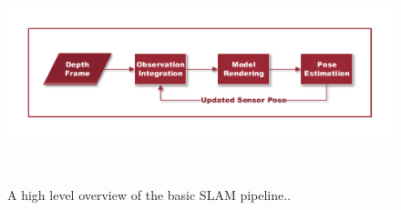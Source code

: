 \begin{figure}[!htbp]
  \centering
  \includegraphics[width=.7\linewidth]{figures/intro/basic_slam.pdf}
  \caption[Basic SLAM Pipeline]{A high level overview of the basic SLAM pipeline..}
~\label{figure:basic_slam}
\end{figure}